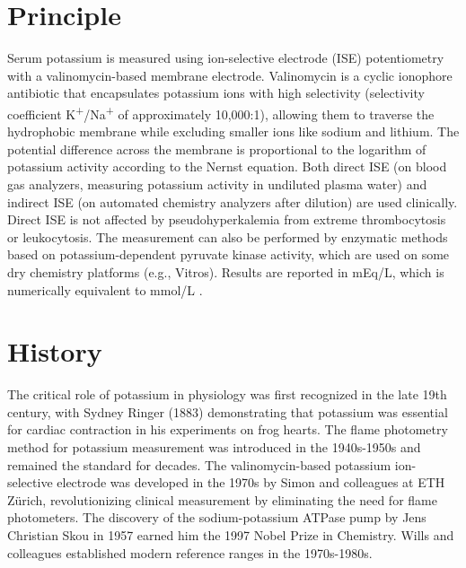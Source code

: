 \section*{Principle}
Serum potassium is measured using ion-selective electrode (ISE) potentiometry with a valinomycin-based membrane electrode. Valinomycin is a cyclic ionophore antibiotic that encapsulates potassium ions with high selectivity (selectivity coefficient K\textsuperscript{+}/Na\textsuperscript{+} of approximately 10,000:1), allowing them to traverse the hydrophobic membrane while excluding smaller ions like sodium and lithium. The potential difference across the membrane is proportional to the logarithm of potassium activity according to the Nernst equation. Both direct ISE (on blood gas analyzers, measuring potassium activity in undiluted plasma water) and indirect ISE (on automated chemistry analyzers after dilution) are used clinically. Direct ISE is not affected by pseudohyperkalemia from extreme thrombocytosis or leukocytosis. The measurement can also be performed by enzymatic methods based on potassium-dependent pyruvate kinase activity, which are used on some dry chemistry platforms (e.g., Vitros). Results are reported in mEq/L, which is numerically equivalent to mmol/L \cite{tietz2012textbook}.

\section*{History}
The critical role of potassium in physiology was first recognized in the late 19th century, with Sydney Ringer (1883) demonstrating that potassium was essential for cardiac contraction in his experiments on frog hearts. The flame photometry method for potassium measurement was introduced in the 1940s-1950s and remained the standard for decades. The valinomycin-based potassium ion-selective electrode was developed in the 1970s by Simon and colleagues at ETH Z\"{u}rich, revolutionizing clinical measurement by eliminating the need for flame photometers. The discovery of the sodium-potassium ATPase pump by Jens Christian Skou in 1957 earned him the 1997 Nobel Prize in Chemistry. Wills and colleagues established modern reference ranges in the 1970s-1980s.

